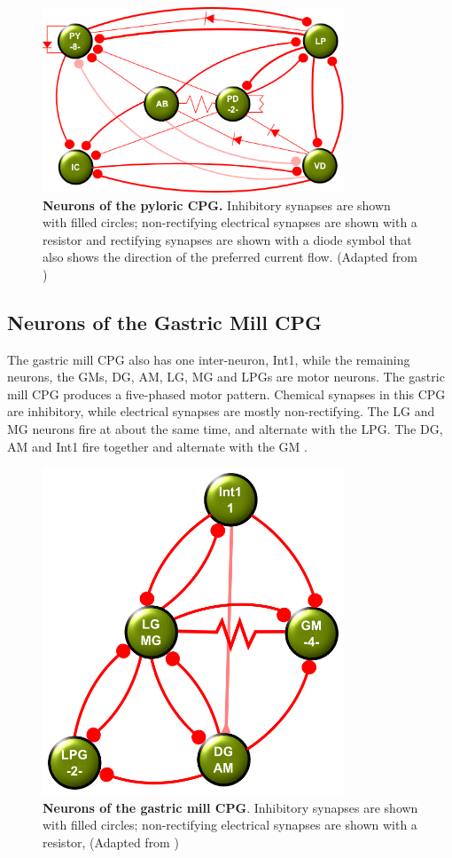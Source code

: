\begin{figure}[H]
	\centering
		\includegraphics[width=9cm]{graphics/pyloriccpg.png}
		\caption[Neurons of the pyloric \ac{CPG}.]{\textbf{Neurons of the pyloric \ac{CPG}.} Inhibitory synapses are shown with filled circles; non-rectifying electrical synapses are shown with a resistor and rectifying synapses are shown with a diode symbol that also shows the direction of the preferred current flow. (Adapted from \cite{Harris-Warrick2011})}
		\label{fig:pyloriccpg}
\end{figure}

\subsection{Neurons of the Gastric Mill CPG}
The gastric mill \ac{CPG} also has one inter-neuron, \ac{Int1}, while the remaining neurons, the \acp{GM}, \ac{DG}, \ac{AM}, \ac{LG}, \ac{MG} and \acp{LPG} are motor neurons. The gastric mill \ac{CPG} produces a five-phased motor pattern. Chemical synapses in this \ac{CPG} are inhibitory, while electrical synapses are mostly non-rectifying. The \ac{LG} and \ac{MG} neurons fire at about the same time, and alternate with the \ac{LPG}. The \ac{DG}, \ac{AM} and \ac{Int1} fire together and alternate with the \ac{GM} \cite{Harris-Warrick1992}.

\begin{figure}[H]
	\centering
		\includegraphics[width=9cm]{graphics/gastriccpg.png}
		\caption[Neurons of the gastric mill \ac{CPG}.]{\textbf{Neurons of the gastric mill \ac{CPG}}.  Inhibitory synapses are shown with filled circles; non-rectifying electrical synapses are shown with a resistor, (Adapted from \cite{Harris-Warrick1992})}
		\label{fig:gastriccpg}
\end{figure}

